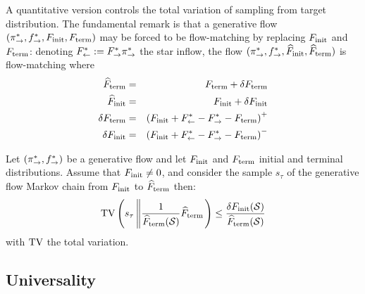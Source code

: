 A quantitative version controls the total variation of sampling from target distribution.
    The fundamental remark is that a generative flow $(\pi_{\rightarrow}^*,f^*_{\rightarrow},F_{\mathrm{init}},F_{\mathrm{term}})$ may be forced to be flow-matching by replacing $F_{\mathrm{init}}$ and $F_{\mathrm{term}}$: denoting $F^*_{\leftarrow} := F^*_{\rightarrow}\pi_{\rightarrow}^*$ the star inflow, the flow $(\pi_{\rightarrow}^*,f^*_{\rightarrow},\widehat {F}_{\mathrm{init}},\widehat{F}_{\mathrm{term}})$ is flow-matching where
    \begin{eqnarray}
        \widehat{F}_{\mathrm{term}} &=& F_{\mathrm{term}} +\delta F_{\mathrm{term}} \\
        \widehat {F}_{\mathrm{init}} &=& F_{\mathrm{init}} +\delta F_{\mathrm{init}} \\
        \delta F_{\mathrm{term}} &=& \left(F_{\mathrm{init}}+F^*_{\leftarrow} - F^*_{\rightarrow}-F_{\mathrm{term}}\right)^+ \\
        \delta F_{\mathrm{init}} &=& \left(F_{\mathrm{init}}+F^*_{\leftarrow} - F^*_{\rightarrow}-F_{\mathrm{term}}\right)^-
    \end{eqnarray}
\begin{theorem}


\label{theo:negative_control}
  Let $(\pi_{\rightarrow}^*, f^*_{\rightarrow})$ be a generative flow and let $F_{\mathrm{init}}$ and $F_{\mathrm{term}}$ initial and terminal distributions. Assume that $F_{\mathrm{init}}\neq 0$, and consider the sample $s_\tau$ of the generative flow Markov chain from $F_{\mathrm{init}}$ to $\widehat{F}_{\mathrm{term}}$ then:
    \begin{equation}
        \mathrm{TV}\left(s_\tau \left\| \frac{1}{\widehat{F}_{\mathrm{term}}(\mathcal S )} \widehat{F}_{\mathrm{term}}\right.\right) \leq  \frac{\delta F_{\mathrm{init}}(\mathcal S)}{\widehat{F}_{\mathrm{term}}(\mathcal S)}
    \end{equation}
    with $\mathrm{TV}$  the total variation.
\end{theorem}

\subsection{Universality}\label{app:universality}

